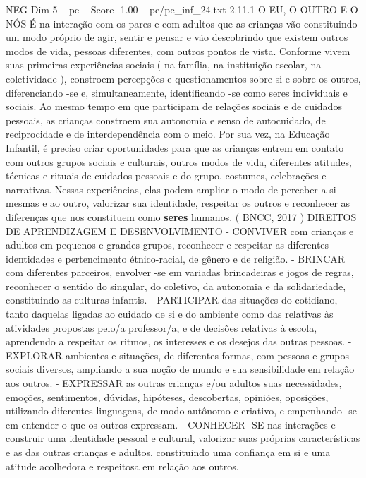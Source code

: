 \begin{textsample}{NEG Dim 5 – pe – Score -1.00 – pe/pe\_inf\_24.txt}  \label{ex:f5_neg_088}
2.11.1 O EU, O OUTRO E O NÓS É na interação com os pares e com adultos que as crianças vão constituindo um modo próprio de agir, sentir e pensar e vão descobrindo que existem outros modos de vida, pessoas diferentes, com outros pontos de vista.
Conforme vivem suas primeiras experiências sociais ( na família, na instituição escolar, na coletividade ), constroem percepções e questionamentos sobre si e sobre os outros, diferenciando -se e, simultaneamente, identificando -se como seres individuais e sociais.
Ao mesmo tempo em que participam de relações sociais e de cuidados pessoais, as crianças constroem sua autonomia e senso de autocuidado, de reciprocidade e de interdependência com o meio.
Por sua vez, na Educação Infantil, é preciso criar oportunidades para que as crianças entrem em contato com outros grupos sociais e culturais, outros modos de vida, diferentes atitudes, técnicas e rituais de cuidados pessoais e do grupo, costumes, celebrações e narrativas.
Nessas experiências, elas podem ampliar o modo de perceber a si mesmas e ao outro, valorizar sua identidade, respeitar os outros e reconhecer as diferenças que nos constituem como \textbf{seres} humanos. ( BNCC, 2017 ) DIREITOS DE APRENDIZAGEM E DESENVOLVIMENTO - CONVIVER com crianças e adultos em pequenos e grandes grupos, reconhecer e respeitar as diferentes identidades e pertencimento étnico-racial, de gênero e de religião. - BRINCAR com diferentes parceiros, envolver -se em variadas brincadeiras e jogos de regras, reconhecer o sentido do singular, do coletivo, da autonomia e da solidariedade, constituindo as culturas infantis. - PARTICIPAR das situações do cotidiano, tanto daquelas ligadas ao cuidado de si e do ambiente como das relativas às atividades propostas pelo/a professor/a, e de decisões relativas à escola, aprendendo a respeitar os ritmos, os interesses e os desejos das outras pessoas. - EXPLORAR ambientes e situações, de diferentes formas, com pessoas e grupos sociais diversos, ampliando a sua noção de mundo e sua sensibilidade em relação aos outros. - EXPRESSAR as outras crianças e/ou adultos suas necessidades, emoções, sentimentos, dúvidas, hipóteses, descobertas, opiniões, oposições, utilizando diferentes linguagens, de modo autônomo e criativo, e empenhando -se em entender o que os outros expressam. - CONHECER -SE nas interações e construir uma identidade pessoal e cultural, valorizar suas próprias características e as das outras crianças e adultos, constituindo uma confiança em si e uma atitude acolhedora e respeitosa em relação aos outros.

\end{textsample}
